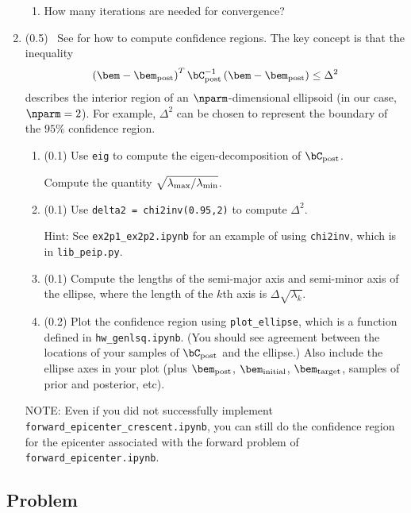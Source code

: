 \documentclass[11pt,titlepage,fleqn]{article}
\newcommand{\tfile}{{\tt hw\_genlsq.ipynb}}
\newcommand{\tfileFE}{{\tt forward\_epicenter.ipynb}}
\newcommand{\tfileFEC}{{\tt forward\_epicenter\_crescent.ipynb}}
\begin{document}
\begin{enumerate}
\begin{enumerate}
\item How many iterations are needed for convergence?
\end{enumerate}


\item (0.5) \ptag\ See \citet[][p.~34--36]{Aster} for how to compute confidence regions. The key concept is that the inequality
%
\begin{equation*}
\left(\bem - \bem_{\rm post} \right)^T \bC_{\rm post}^{-1} \left(\bem - \bem_{\rm post} \right) \le \Delta^2
\end{equation*}
%
describes the interior region of an $\nparm$-dimensional ellipsoid (in our case, $\nparm=2$). For example, $\Delta^2$ can be chosen to represent the boundary of the $95\%$ confidence region.
%
\begin{enumerate}
\item (0.1) Use \verb+eig+ to compute the eigen-decomposition of $\bC_{\rm post}$.

Compute the quantity $\sqrt{\lambda_{\rm max}/\lambda_{\rm min}}$.

\item (0.1) Use \verb+delta2 = chi2inv(0.95,2)+ to compute $\Delta^2$.

Hint: See \verb+ex2p1_ex2p2.ipynb+ for an example of using \verb+chi2inv+, which is in \verb+lib_peip.py+.

\item (0.1) Compute the lengths of the semi-major axis and semi-minor axis of the ellipse, where the length of the $k$th axis is $\Delta\sqrt{\lambda_k}$.

\item (0.2) Plot the confidence region using \verb+plot_ellipse+, which is a function defined in \tfile. (You should see agreement between the locations of your samples of $\bC_{\rm post}$ and the ellipse.) Also include the ellipse axes in your plot (plus $\bem_{\rm post}$, $\bem_{\rm initial}$, $\bem_{\rm target}$, samples of prior and posterior, etc).
\end{enumerate}

NOTE: Even if you did not successfully implement \tfileFEC, you can still do the confidence region for the epicenter associated with the forward problem of \tfileFE.

\end{enumerate}



\subsection*{Problem} \howmuchtime\
\end{document}
